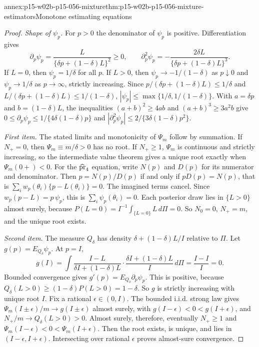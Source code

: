 \begin{annexitem}{annex:p15-w02b-p15-056-mixture}{thm:p15-w02b-p15-056-mixture-estimators}{Monotone estimating equations}
\begin{proof}
\emph{Shape of \(\psi_p\).} For \(p>0\) the denominator of \(\psi_p\)
is positive. Differentiation gives
\[
 \partial_p\psi_p=\frac{L}{\{\delta p+(1-\delta)L\}^2}\geq0,
 \qquad
 \partial_p^2\psi_p=-\frac{2\delta L}{\{\delta p+(1-\delta)L\}^3}.
\]
If \(L=0\), then \(\psi_p=1/\delta\) for all \(p\). If \(L>0\), then
\(\psi_p\to-1/(1-\delta)\) as \(p\downarrow0\) and \(\psi_p\to1/\delta\)
as \(p\to\infty\), strictly increasing. Since \(p/(\delta p+(1-\delta)L)\leq1/\delta\)
and \(L/(\delta p+(1-\delta)L)\leq1/(1-\delta)\),
\(|\psi_p|\leq\max\{1/\delta,1/(1-\delta)\}\). With \(a=\delta p\) and
\(b=(1-\delta)L\), the inequalities \((a+b)^2\geq4ab\) and
\((a+b)^3\geq3a^2b\) give
\(0\leq\partial_p\psi_p\leq1/\{4\delta(1-\delta)p\}\) and
\(|\partial_p^2\psi_p|\leq2/\{3\delta(1-\delta)p^2\}\).

\emph{First item.} The stated limits and monotonicity of \(\Psi_m\)
follow by summation. If \(N_+=0\), then \(\Psi_m\equiv m/\delta>0\) has
no root. If \(N_+\geq1\), \(\Psi_m\) is continuous and strictly
increasing, so the intermediate value theorem gives a unique root exactly
when \(\Psi_m(0+)<0\). For the \(\widehat{\rm pr}_4\) equation, write
\(N(p)\) and \(D(p)\) for its numerator and denominator. Then \(p=N(p)/D(p)\)
if and only if \(pD(p)=N(p)\), that is
\(\sum_iw_p(\theta_i)\{p-L(\theta_i)\}=0\). The imagined terms cancel.
Since \(w_p(p-L)=p\,\psi_p\), this is \(\sum_i\psi_p(\theta_i)=0\). Each
posterior draw lies in \(\{L>0\}\) almost surely, because
\(P(L=0)=I^{-1}\int_{\{L=0\}}L\,d\Pi=0\). So \(N_0=0\), \(N_+=m\), and
the unique root exists.

\emph{Second item.} The measure \(Q_\delta\) has density
\(\delta+(1-\delta)L/I\) relative to \(\Pi\). Let
\(g(p)=E_{Q_\delta}\psi_p\). At \(p=I\),
\[
 g(I)=\int\frac{I-L}{\delta I+(1-\delta)L}\cdot
 \frac{\delta I+(1-\delta)L}{I}\,d\Pi=\frac{I-I}{I}=0 .
\]
Bounded convergence gives \(g'(p)=E_{Q_\delta}\partial_p\psi_p\). This
is positive, because \(Q_\delta(L>0)\geq(1-\delta)P(L>0)=1-\delta\). So
\(g\) is strictly increasing with unique root \(I\). Fix a rational
\(\epsilon\in(0,I)\). The bounded i.i.d. strong law gives
\(\Psi_m(I\pm\epsilon)/m\to g(I\pm\epsilon)\) almost surely, with
\(g(I-\epsilon)<0<g(I+\epsilon)\), and \(N_+/m\to Q_\delta(L>0)>0\).
Almost surely, therefore, eventually \(N_+\geq1\) and
\(\Psi_m(I-\epsilon)<0<\Psi_m(I+\epsilon)\). Then the root exists, is
unique, and lies in \((I-\epsilon,I+\epsilon)\). Intersecting over
rational \(\epsilon\) proves almost-sure convergence.


\end{proof}
\end{annexitem}
